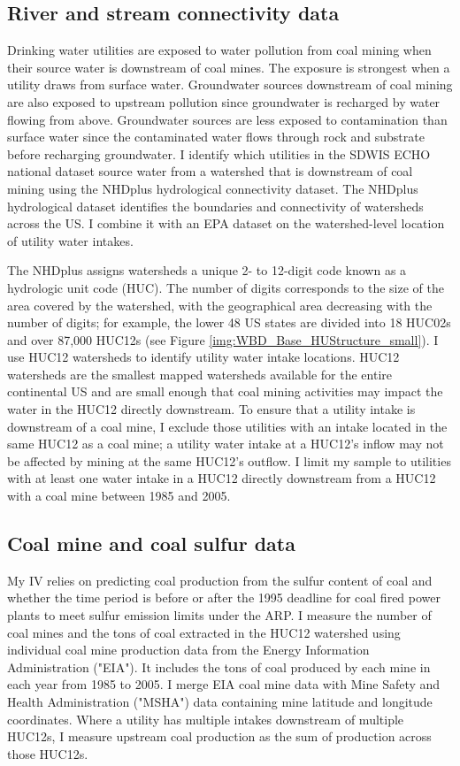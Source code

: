 \documentclass[12pt]{article}
\begin{document}
\subsection{River and stream connectivity data}

Drinking water utilities are exposed to water pollution from coal mining when their source water is downstream of coal mines. The exposure is strongest when a utility draws from surface water. Groundwater sources downstream of coal mining are also exposed to upstream pollution since groundwater is recharged by water flowing from above. Groundwater sources are less exposed to contamination than surface water since the contaminated water flows through rock and substrate before recharging groundwater. I identify which utilities in the SDWIS ECHO national dataset source water from a watershed that is downstream of coal mining using the NHDplus hydrological connectivity dataset. The NHDplus hydrological dataset identifies the boundaries and connectivity of watersheds across the US. I combine it with an EPA dataset on the watershed-level location of utility water intakes. 

The NHDplus assigns watersheds a unique 2- to 12-digit code known as a hydrologic unit code (HUC). The number of digits corresponds to the size of the area covered by the watershed, with the geographical area decreasing with the number of digits; for example, the lower 48 US states are divided into 18 HUC02s and over 87,000 HUC12s (see Figure \ref{img:WBD_Base_HUStructure_small}). I use HUC12 watersheds to identify utility water intake locations. HUC12 watersheds are the smallest mapped watersheds available for the entire continental US and are small enough that coal mining activities may impact the water in the HUC12 directly downstream. To ensure that a utility intake is downstream of a coal mine, I exclude those utilities with an intake located in the same HUC12 as a coal mine; a utility water intake at a HUC12's inflow may not be affected by mining at the same HUC12's outflow. I limit my sample to utilities with at least one water intake in a HUC12 directly downstream from a HUC12 with a coal mine between 1985 and 2005.

\subsection{Coal mine and coal sulfur data}

My IV relies on predicting coal production from the sulfur content of coal and whether the time period is before or after the 1995 deadline for coal fired power plants to meet sulfur emission limits under the ARP. I measure the number of coal mines and the tons of coal extracted in the HUC12 watershed using individual coal mine production data from the Energy Information Administration ("EIA"). It includes the tons of coal produced by each mine in each year from 1985 to 2005. I merge EIA coal mine data with Mine Safety and Health Administration ("MSHA") data containing mine latitude and longitude coordinates. Where a utility has multiple intakes downstream of multiple HUC12s, I measure upstream coal production as the sum of production across those HUC12s. 
\end{document}
